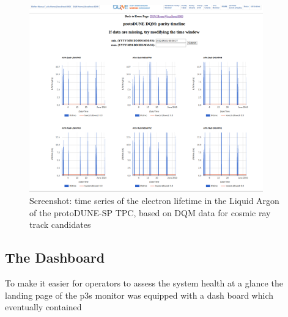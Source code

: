 \documentclass{webofc}
\begin{document}
\begin{figure}[h]
\centering
\includegraphics[width=0.9\textwidth,clip]{figures/purity2019.png}
\caption{Screenshot: time series of the electron lifetime in the Liquid Argon of the protoDUNE-SP TPC, based on
DQM data for cosmic ray track candidates}
\label{fig:purity}
\end{figure}

\subsection{The Dashboard}
\label{sec:dashboard}

To make it easier for operators to assess the system health at a glance the landing page of the p3s monitor was equipped
with a dash board which eventually contained
\end{document}
